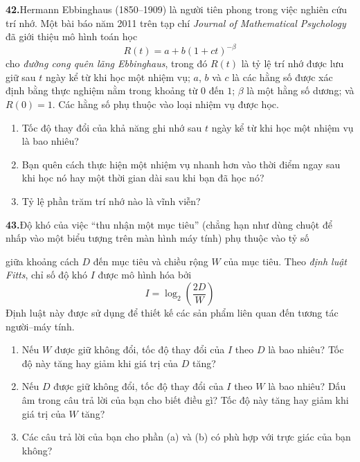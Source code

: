 \noindent
\begin{minipage}[t]{0.485\textwidth}
    \fontsize{8.8}{11.2}\selectfont
    \noindent\textbf{42.}\enspace Hermann Ebbinghaus (1850--1909) là người tiên phong trong việc nghiên cứu trí nhớ. Một bài báo năm 2011 trên tạp chí \textit{Journal of Mathematical Psychology} đã giới thiệu mô hình toán học
    \[
    R(t) = a + b(1 + ct)^{-\beta}
    \]
    cho \textit{đường cong quên lãng Ebbinghaus}, trong đó $R(t)$ là tỷ lệ trí nhớ được lưu giữ sau $t$ ngày kể từ khi học một nhiệm vụ; $a$, $b$ và $c$ là các hằng số được xác định bằng thực nghiệm nằm trong khoảng từ $0$ đến $1$; $\beta$ là một hằng số dương; và $R(0) = 1$. Các hằng số phụ thuộc vào loại nhiệm vụ được học.
    \begin{enumerate}[label=\textbf{(\alph*)}, leftmargin=*, itemsep=1pt, topsep=2pt, parsep=0pt]
        \item Tốc độ thay đổi của khả năng ghi nhớ sau $t$ ngày kể từ khi học một nhiệm vụ là bao nhiêu?
        \item Bạn quên cách thực hiện một nhiệm vụ nhanh hơn vào thời điểm ngay sau khi học nó hay một thời gian dài sau khi bạn đã học nó?
        \item Tỷ lệ phần trăm trí nhớ nào là vĩnh viễn?
    \end{enumerate}

    \vspace{4pt}
    \noindent\textbf{43.}\enspace Độ khó của việc ``thu nhận một mục tiêu'' (chẳng hạn như dùng chuột để nhấp vào một biểu tượng trên màn hình máy tính) phụ thuộc vào tỷ số
\end{minipage}%
\hfill
\begin{minipage}[t]{0.485\textwidth}
    \fontsize{8.8}{11.2}\selectfont
    \noindent giữa khoảng cách $D$ đến mục tiêu và chiều rộng $W$ của mục tiêu. Theo \textit{định luật Fitts}, chỉ số độ khó $I$ được mô hình hóa bởi
    \[
    I = \log_2\left(\frac{2D}{W}\right)
    \]
    Định luật này được sử dụng để thiết kế các sản phẩm liên quan đến tương tác người--máy tính.
    \begin{enumerate}[label=\textbf{(\alph*)}, leftmargin=*, itemsep=1pt, topsep=2pt, parsep=0pt]
        \item Nếu $W$ được giữ không đổi, tốc độ thay đổi của $I$ theo $D$ là bao nhiêu? Tốc độ này tăng hay giảm khi giá trị của $D$ tăng?
        \item Nếu $D$ được giữ không đổi, tốc độ thay đổi của $I$ theo $W$ là bao nhiêu? Dấu âm trong câu trả lời của bạn cho biết điều gì? Tốc độ này tăng hay giảm khi giá trị của $W$ tăng?
        \item Các câu trả lời của bạn cho phần (a) và (b) có phù hợp với trực giác của bạn không?
    \end{enumerate}
\end{minipage}

